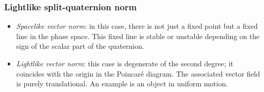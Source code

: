 \subsubsection*{Lightlike split-quaternion norm}
    \begin{itemize}
        \item[\circled{2}] \emph{Spacelike vector norm}: in this case, there is not just a fixed point but a fixed line in the phase space. This fixed line is stable or unstable depending on the sign of the scalar part of the quaternion. 
        \item[\circled{3}] \emph{Lightlike vector norm}: this case is degenerate of the second degree; it coincides with the origin in the Poincaré diagram. The associated vector field is purely translational. An example is an object in uniform motion.
    \end{itemize}
